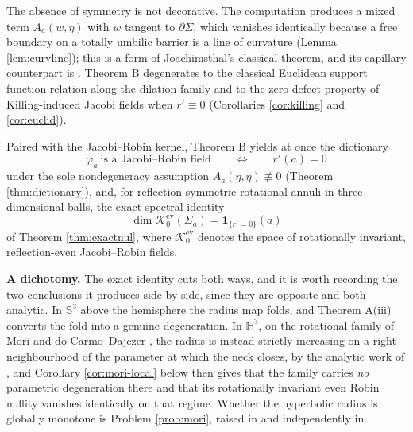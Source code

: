 \documentclass[10pt,a4paper]{amsart}
\newcommand{\Sph}{\mathbb{S}}
\newcommand{\Hyp}{\mathbb{H}}
\newcommand{\Ker}{\mathcal{K}}
\begin{document}
The absence of symmetry is not decorative. The computation produces a mixed term $A_a(w,\eta)$ with $w$ tangent to $\partial\Sigma$, which vanishes identically because a free boundary on a totally umbilic barrier is a line of curvature (Lemma \ref{lem:curvline}); this is a form of Joachimsthal's classical theorem, and its capillary counterpart is \cite[Lem. 2.5]{NZ1}. Theorem B degenerates to the classical Euclidean support function relation along the dilation family and to the zero-defect property of Killing-induced Jacobi fields when $r'\equiv 0$ (Corollaries \ref{cor:killing} and \ref{cor:euclid}).

Paired with the Jacobi--Robin kernel, Theorem B yields at once the dictionary
\[
\varphi_a\ \text{is a Jacobi--Robin field}\qquad\Longleftrightarrow\qquad r'(a)=0
\]
under the sole nondegeneracy assumption $A_a(\eta,\eta)\not\equiv 0$ (Theorem \ref{thm:dictionary}), and, for reflection-symmetric rotational annuli in three-dimensional balls, the exact spectral identity
\[
\dim\Ker_0^{\mathrm{ev}}(\Sigma_a)=\mathbf{1}_{\{r'=0\}}(a)
\]
of Theorem \ref{thm:exactnul}, where $\Ker_0^{\mathrm{ev}}$ denotes the space of rotationally invariant, reflection-even Jacobi--Robin fields.

\medskip
\noindent\textbf{A dichotomy.} The exact identity cuts both ways, and it is worth recording the two conclusions it produces side by side, since they are opposite and both analytic. In $\Sph^3$ above the hemisphere the radius map folds, and Theorem A(iii) converts the fold into a genuine degeneration. In $\Hyp^3$, on the rotational family of Mori \cite{Mori81} and do Carmo--Dajczer \cite{dCD83}, the radius is instead strictly increasing on a right neighbourhood of the parameter at which the neck closes, by the analytic work of \cite{P1}, and Corollary \ref{cor:mori-local} below then gives that the family carries \emph{no} parametric degeneration there and that its rotationally invariant even Robin nullity vanishes identically on that regime. Whether the hyperbolic radius is globally monotone is Problem \ref{prob:mori}, raised in \cite[Rem.~4.3]{dO-thesis} and independently in \cite[Question 6.3]{P2}.
\end{document}
